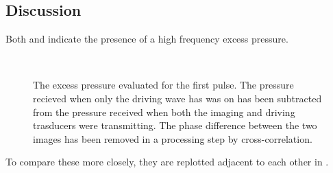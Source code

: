 \subsection{Discussion}
Both  and 
indicate the presence of a high frequency excess pressure.




\begin{figure}[t]%
  \centering
 \quad
  \subfloat[2nd pulse - 150]{
    \label{fig:exp:2nd:av:time:150:comp:control:cross:full}
    }\\
\quad
  \subfloat[2nd pulse - 250]{
    \label{fig:exp:2nd:av:time:150:comp:control:cross:full}
    }
\caption{
    The excess pressure evaluated for the first pulse.  
    The pressure recieved when only the driving wave has was on has been subtracted from the pressure received when both the imaging and driving trasducers were transmitting.
    The phase difference between the two images has been removed in a processing step by cross-correlation.
  }
  \label{fig:exp:av:time:comp:control:cross:full}
\end{figure}

To compare these more closely, they are
replotted adjacent to each other in .


\clearpage

